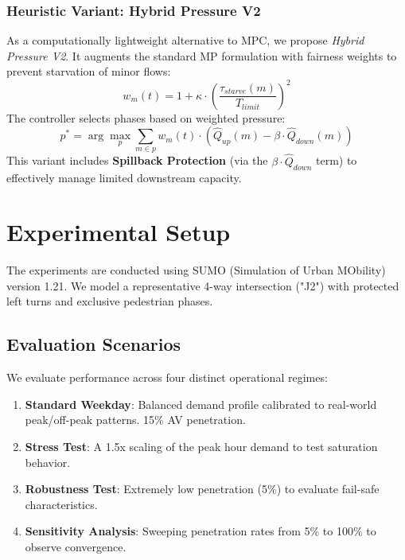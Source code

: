 \documentclass[conference]{IEEEtran}
\begin{document}
\subsubsection{Heuristic Variant: Hybrid Pressure V2}
As a computationally lightweight alternative to MPC, we propose \textit{Hybrid Pressure V2}. It augments the standard MP formulation with fairness weights to prevent starvation of minor flows:
\begin{equation}
    w_m(t) = 1 + \kappa \cdot \left(\frac{\tau_{starve}(m)}{T_{limit}}\right)^2
\end{equation}
The controller selects phases based on weighted pressure:
\begin{equation}
    p^* = \arg\max_{p} \sum_{m \in p} w_m(t) \cdot (\hat{Q}_{up}(m) - \beta \cdot \hat{Q}_{down}(m))
\end{equation}
This variant includes \textbf{Spillback Protection} (via the $\beta \cdot \hat{Q}_{down}$ term) to effectively manage limited downstream capacity.

\section{Experimental Setup}
\label{sec:setup}





The experiments are conducted using SUMO (Simulation of Urban MObility) version 1.21. We model a representative 4-way intersection ("J2") with protected left turns and exclusive pedestrian phases.



\subsection{Evaluation Scenarios}
We evaluate performance across four distinct operational regimes:
\begin{enumerate}
    \item \textbf{Standard Weekday}: Balanced demand profile calibrated to real-world peak/off-peak patterns. 15\% AV penetration.
    \item \textbf{Stress Test}: A 1.5x scaling of the peak hour demand to test saturation behavior.
    \item \textbf{Robustness Test}: Extremely low penetration (5\%) to evaluate fail-safe characteristics.
    \item \textbf{Sensitivity Analysis}: Sweeping penetration rates from 5\% to 100\% to observe convergence.
\end{enumerate}
\end{document}
